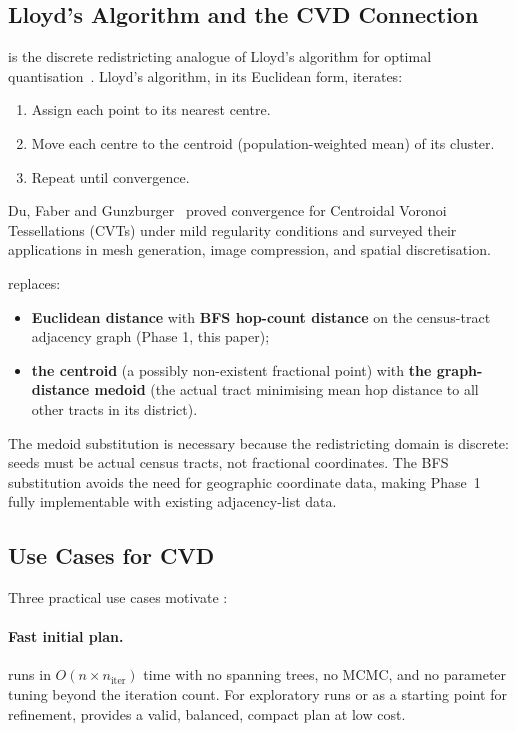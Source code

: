 \subsection{Lloyd's Algorithm and the CVD Connection}

\cvd{} is the discrete redistricting analogue of Lloyd's algorithm for
optimal quantisation~\citep{lloyd1982}.
Lloyd's algorithm, in its Euclidean form, iterates:
\begin{enumerate}
\item Assign each point to its nearest centre.
\item Move each centre to the centroid (population-weighted mean) of its cluster.
\item Repeat until convergence.
\end{enumerate}
Du, Faber and Gunzburger~\citeyear{du1999} proved convergence for Centroidal
Voronoi Tessellations (CVTs) under mild regularity conditions and surveyed their
applications in mesh generation, image compression, and spatial discretisation.

\cvd{} replaces:
\begin{itemize}
\item \textbf{Euclidean distance} with \textbf{BFS hop-count distance} on the
  census-tract adjacency graph (Phase 1, this paper);
\item \textbf{the centroid} (a possibly non-existent fractional point) with
  \textbf{the graph-distance medoid} (the actual tract minimising mean hop
  distance to all other tracts in its district).
\end{itemize}
The medoid substitution is necessary because the redistricting domain is
discrete: seeds must be actual census tracts, not fractional coordinates.
The BFS substitution avoids the need for geographic coordinate data, making
Phase~1 fully implementable with existing adjacency-list data.

\subsection{Use Cases for CVD}

Three practical use cases motivate \cvd{}:

\paragraph{Fast initial plan.}
\cvd{} runs in $O(n \times n_{\mathrm{iter}})$ time with no spanning trees,
no MCMC, and no parameter tuning beyond the iteration count.
For exploratory runs or as a starting point for \sa{} refinement, \cvd{}
provides a valid, balanced, compact plan at low cost.

